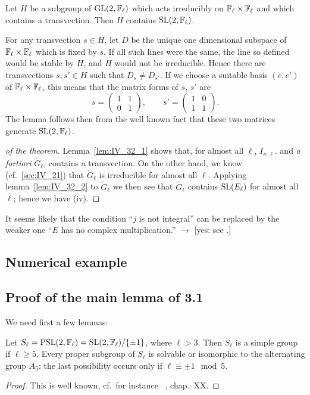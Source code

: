 \begin{lem}\label{lem:IV_32_2}
	Let $H$ be a subgroup of $\operatorname{GL}(2, \mathbb{F}_\ell)$ which acts irreducibly on
	$\mathbb{F}_\ell\times\mathbb{F}_\ell$ and which contains a transvection. Then $H$
	contains $\operatorname{SL}(2, \mathbb{F}_\ell)$.
\end{lem}

For any transvection $s \in H$, let $D$ be the unique one dimensional subspace
of $\mathbb{F}_\ell\times\mathbb{F}_\ell$ which is fixed by $s$. If all such lines were the
same, the line so defined would be stable by $H$, and $H$ would not be
irreducible. Hence there are transvections $s, s' \in H$ such that $D_s \ne
D_{s'}$. If we choose a suitable basis $(e,e')$ of $\mathbb{F}_\ell\times\mathbb{F}_\ell$, this
means that the matrix forms of $s$, $s'$ are
\[
	s =
	\begin{pmatrix}
		1 & 1 \\
		0 & 1
	\end{pmatrix}, \qquad s' = 
	\begin{pmatrix}
		1 & 0 \\
		1 & 1
	\end{pmatrix}.
\]
The lemma follows then from the well known fact that these two matrices
generate $\operatorname{SL}(2, \mathbb{F}_\ell)$.

\begin{proof}[ of the theorem]
	Lemma~\ref{lem:IV_32_1} shows that, for almost all $\ell$, $I_{v,
	\ell}$.  and \emph{a fortiori} $\widetilde{G}_\ell$, contains a
	transvection. On the other hand, we know (cf.\ \ref{sec:IV_21}) that
	$\widetilde{G}_\ell$ is irreducible for almost all $\ell$. Applying
	lemma~\ref{lem:IV_32_2} to $\widetilde{G}_\ell$ we then see that
	$\widetilde{G}_\ell$ contains $\operatorname{SL}({E}_{\ell})$ for almost all
	$\ell$; hence we have (iv).
\end{proof}

\begin{obs}
	It seems likely that the condition ``$j$ is not integral'' can be
	replaced by the weaker one ``$E$ has no complex multiplication.''
	$\to$ [yes: see \cite{76}.]
\end{obs}

\subsection{Numerical example}
\label{sec:IV_33}

\subsection{Proof of the main lemma of 3.1}
\label{sec:IV_34}
\dpage
We need first a few lemmas:
\begin{lem}\label{lem:IV_34_1}
	Let $S_\ell = \operatorname{PSL}(2, \mathbb{F}_\ell) = \operatorname{SL}(2, \mathbb{F}_\ell)/\{ \pm 1 \}$, where
	$\ell > 3$.
	Then $S_\ell$ is a simple group if $\ell \ge 5$. Every proper subgroup
	of $S_\ell$ is solvable or isomorphic to the alternating group $A_5$:
	the last possibility occurs only if $\ell \equiv \pm 1 \mod 5$.
\end{lem}
\begin{proof}
	This is well known, cf.\ for instance \citeauthor{4}~\cite{4}, chap.\ XX.
\end{proof}

